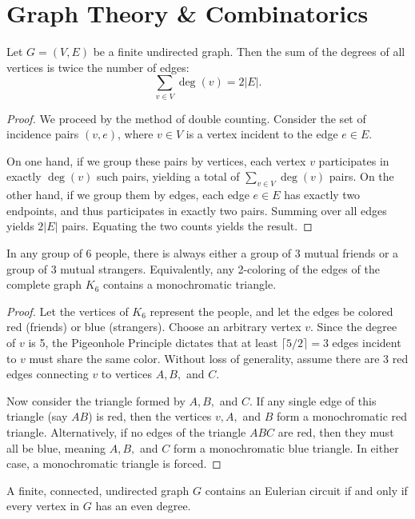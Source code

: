 \documentclass[11pt]{scrartcl}
\begin{document}
\section{Graph Theory \& Combinatorics}

\begin{lemma}
    Let $G = (V,E)$ be a finite undirected graph. Then the sum of the degrees of all vertices is twice the number of edges:
    \[ \sum_{v \in V} \deg(v) = 2|E|. \]
\end{lemma}
\begin{proof}
    We proceed by the method of double counting. Consider the set of incidence pairs $(v, e)$, where $v \in V$ is a vertex incident to the edge $e \in E$. 
    
    On one hand, if we group these pairs by vertices, each vertex $v$ participates in exactly $\deg(v)$ such pairs, yielding a total of $\sum_{v \in V} \deg(v)$ pairs. On the other hand, if we group them by edges, each edge $e \in E$ has exactly two endpoints, and thus participates in exactly two pairs. Summing over all edges yields $2|E|$ pairs. Equating the two counts yields the result.
\end{proof}

\begin{theorem}
    In any group of 6 people, there is always either a group of 3 mutual friends or a group of 3 mutual strangers. Equivalently, any 2-coloring of the edges of the complete graph $K_6$ contains a monochromatic triangle.
\end{theorem}

\begin{proof}
    Let the vertices of $K_6$ represent the people, and let the edges be colored red (friends) or blue (strangers). Choose an arbitrary vertex $v$. Since the degree of $v$ is 5, the Pigeonhole Principle dictates that at least $\lceil 5/2 \rceil = 3$ edges incident to $v$ must share the same color. Without loss of generality, assume there are 3 red edges connecting $v$ to vertices $A, B,$ and $C$.
    
    Now consider the triangle formed by $A, B,$ and $C$. If any single edge of this triangle (say $AB$) is red, then the vertices $v, A,$ and $B$ form a monochromatic red triangle. Alternatively, if no edges of the triangle $ABC$ are red, then they must all be blue, meaning $A, B,$ and $C$ form a monochromatic blue triangle. In either case, a monochromatic triangle is forced.
\end{proof}
\begin{theorem}
    A finite, connected, undirected graph $G$ contains an Eulerian circuit if and only if every vertex in $G$ has an even degree.
\end{theorem}
\end{document}
